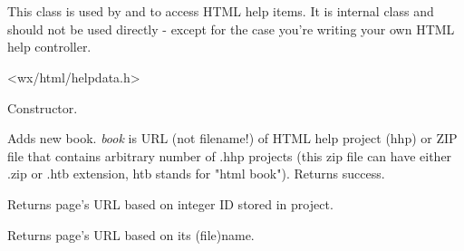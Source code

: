 %
%

\section{}\label{wxhtmlhelpdata}

This class is used by  
and  to access HTML help items.
It is internal class and should not be used directly - except for the case 
you're writing your own HTML help controller.




<wx/html/helpdata.h>


\label{wxhtmlhelpdatawxhtmlhelpdata}


Constructor.

\label{wxhtmlhelpdataaddbook}


Adds new book. {\it book} is URL (not filename!) of HTML help project (hhp)
or ZIP file that contains arbitrary number of .hhp projects (this zip
file can have either .zip or .htb extension, htb stands for "html book").
Returns success.

\label{wxhtmlhelpdatafindpagebyid}


Returns page's URL based on integer ID stored in project.

\label{wxhtmlhelpdatafindpagebyname}


Returns page's URL based on its (file)name.

\label{wxhtmlhelpdatagetbookrecarray}


